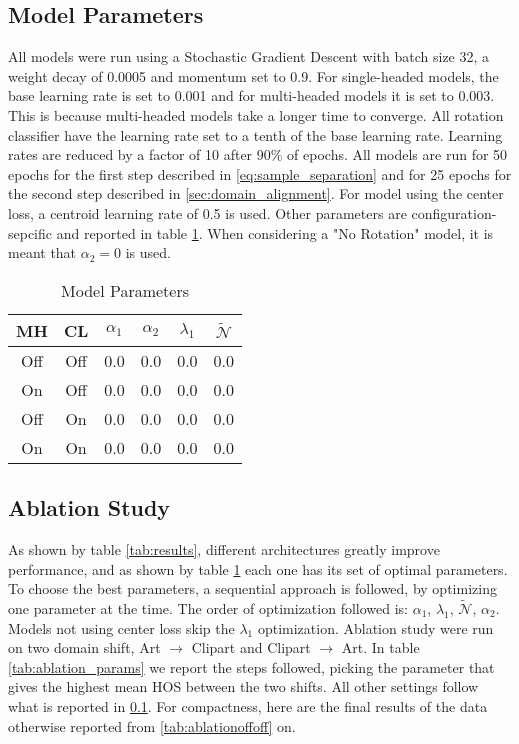 \documentclass[10pt,twocolumn,letterpaper]{article}
\begin{document}
\subsection{Model Parameters}
\label{sec:model_parameters}

All models were run using a Stochastic Gradient Descent with batch size 32, a weight decay of 0.0005 and momentum set to 0.9.
For single-headed models, the base learning rate is set to 0.001 and for multi-headed models it is set to 0.003.
This is because multi-headed models take a longer time to converge.
All rotation classifier have the learning rate set to a tenth of the base learning rate.
Learning rates are reduced by a factor of 10 after 90\% of epochs.
All models are run for 50 epochs for the first step described in \ref{eq:sample_separation} and for 25 epochs for the second step described in \ref{sec:domain_alignment}.
For model using the center loss, a centroid learning rate of 0.5 is used.
Other parameters are configuration-sepcific and reported in table \ref{tab:params}.
When considering a "No Rotation" model, it is meant that $\alpha_2 = 0$ is used.


\begin{table}
  \centering
  \begin{tabular}[b]{||c|c|c|c|c|c||}
    \hline
    MH & CL & $\alpha_1$ & $\alpha_2$ & $\lambda_1$ & $\mathcal{\tilde N}$ \\
    \hline
    Off & Off & 0.0 & 0.0 & 0.0 & 0.0 \\
    On & Off & 0.0 & 0.0 & 0.0 & 0.0 \\
    Off & On & 0.0 & 0.0 & 0.0 & 0.0 \\
    On & On & 0.0 & 0.0 & 0.0 & 0.0 \\
    \hline
  \end{tabular}
  \caption{\label{tab:params}Model Parameters}
\end{table}

\subsection{Ablation Study}
\label{sec:ablation_study}
As shown by table \ref{tab:results}, different architectures greatly improve performance, and as shown by table \ref{tab:params} each one has its set of optimal parameters.
To choose the best parameters, a sequential approach is followed, by optimizing one parameter at the time.
The order of optimization followed is: $\alpha_1$, $\lambda_1$, $\mathcal{\tilde N}$, $\alpha_2$.
Models not using center loss skip the $\lambda_1$ optimization.
Ablation study were run on two domain shift, Art $\to$ Clipart and Clipart $\to$ Art.
In table \ref{tab:ablation_params} we report the steps followed, picking the parameter that gives the highest mean HOS between the two shifts.
All other settings follow what is reported in \ref{sec:model_parameters}.
For compactness, here are the final results of the data otherwise reported from \ref{tab:ablationoffoff} on.
\end{document}

